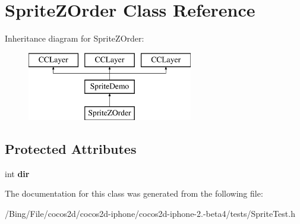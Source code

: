 \hypertarget{interface_sprite_z_order}{\section{Sprite\-Z\-Order Class Reference}
\label{interface_sprite_z_order}
}
Inheritance diagram for Sprite\-Z\-Order\-:\begin{figure}[H]
\begin{center}
\leavevmode
\includegraphics[height=3.000000cm]{interface_sprite_z_order}
\end{center}
\end{figure}
\subsection*{Protected Attributes}
\begin{DoxyCompactItemize}
\item 
\hypertarget{interface_sprite_z_order_abbf9701f23617a0d684faa64eb511b36}{int {\bfseries dir}}\label{interface_sprite_z_order_abbf9701f23617a0d684faa64eb511b36}

\end{DoxyCompactItemize}


The documentation for this class was generated from the following file\-:\begin{DoxyCompactItemize}
\item 
/\-Bing/\-File/cocos2d/cocos2d-\/iphone/cocos2d-\/iphone-\/2.-\/beta4/tests/Sprite\-Test.\-h\end{DoxyCompactItemize}
